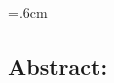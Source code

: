 \baselineskip=.6cm
\begin{latin}
\begin{comment}
\latinuniversity{Shahid Beheshti University}
\latinfaculty{Faculty of Computer Science and Engineering}
\latindegree{M.Sc of Artificial Intelligence}
\latinfield{Artificial Intelligence}
\latintitle{An Efficient Method for Blind Image Quality Assessment}
\firstlatinsupervisor{Dr. Mohsen Ebrahimi Moghaddam}
\latinname{Mohammad Masood}
\latinsurname{Masaeli}
\latinthesisdate{2015}
\latinkeywords{Blind image quality assessment, Computational  image aesthetic, Statistical model}
\en-abstract{\noindent
The main goal of image quality assessment methods is imitation of human perceptual image quality judgments, therefore, the correlation between objective scores of these methods with corresponding human perceptual scores is considered as their performance. Human judgment of image quality implicitly comprehends many factors which some are ignored by current Blind Image Quality Assessment (BIQA) methods. They only consider content independent factors like sharpness, noise, dynamic range, contrast, distortion, exposure accuracy and blur, while the human judgment on image quality also considers image content and aesthetics. This results in different opinion scores for images affected by same distortions with same severity. In order to simulate human judgments in this thesis, we proposed an approach to enrich features of existing BIQA methods by a bag of aesthetic based features. The proposed features are tested on benchmark databases and showed capability of making improvements on state-of-the-art methods' performances. Finally a new method for BIQA implemented which involves one of the best state-of-the-art methods enriched by aesthetic features and by intensive experiments, proved to be able to beat all other methods in accuracy.
}
\latinvtitle
\end{comment}
\newpage\thispagestyle{empty}
\chapter*{Abstract:}
\vspace*{3cm}


\end{latin}
